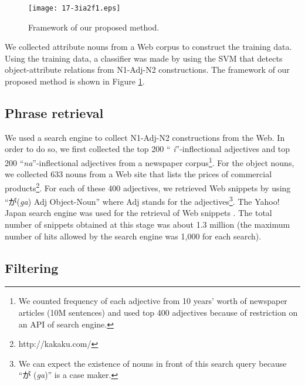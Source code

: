 \documentclass[english]{jnlp_1.4}
\begin{document}
\begin{figure}[b]
\begin{center}
\texttt{[image: 17-3ia2f1.eps]}
\end{center}
  \caption{Framework of our proposed method.}
  \label{fig:framework}
\end{figure}

We collected attribute nouns from a Web corpus to construct
the training data. Using the training data, a classifier was made by
using the SVM that detects object-attribute relations from N1-Adj-N2
constructions. The framework of our proposed method is shown in Figure \ref{fig:framework}.


\subsection{Phrase retrieval}

We used a search engine to collect N1-Adj-N2 constructions from the
Web. In order to do so, we first collected the top 200 ``{\it
i}''-inflectional adjectives and top 200 ``{\it na}''-inflectional
adjectives from a newspaper corpus\footnote{We counted frequency of each
adjective from 10 years' worth of newspaper articles (10M
sentences) and used top 400 adjectives because of restriction on
an API of search engine.}. For the object nouns, we collected 633 nouns
from a Web site that lists the prices of commercial
products\footnote{http://kakaku.com/}.  For each of these 400
adjectives, we retrieved Web snippets by using ``が({\it ga}) Adj
Object-Noun'' where Adj stands for the adjectives\footnote{We can
expect the existence of nouns in front of this search query because ``が
({\it ga})'' is a case maker.}. The Yahoo!  Japan search engine was
used for the retrieval of Web snippets \cite{yahoo:2008}.  The total
number of snippets obtained at this stage was about 1.3 million (the
maximum number of hits allowed by the search engine was 1,000 for each
search).


\vspace{0.3\baselineskip}

\subsection{Filtering}
\end{document}
